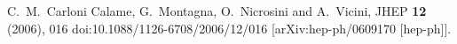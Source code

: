 \documentclass{article}
\begin{document}
% 
% 




\begin{thebibliography}{99}


C.~M.~Carloni Calame, G.~Montagna, O.~Nicrosini and A.~Vicini,
JHEP \textbf{12} (2006), 016
doi:10.1088/1126-6708/2006/12/016
[arXiv:hep-ph/0609170 [hep-ph]].


\end{thebibliography}
\end{document}
